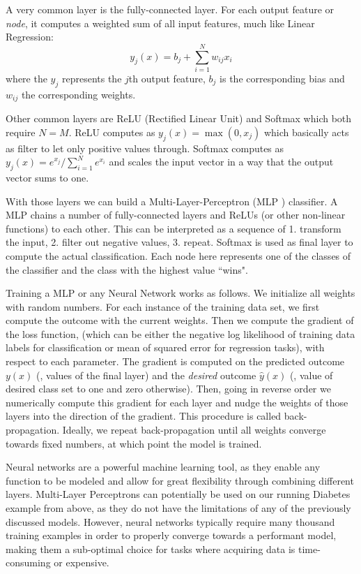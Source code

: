 A very common layer is the fully-connected layer.
For each output feature or \emph{node}, it computes a weighted sum of all input features, much like Linear Regression:
\[
y_j(x) = b_j + \sum^{N}_{i = 1} w_{ij} x_i
\]
where the $y_j$ represents the $j$th output feature, $b_j$ is the corresponding bias and $w_{ij}$ the corresponding weights.

Other common layers are ReLU (Rectified Linear Unit) and Softmax which both require $N = M$.
ReLU computes as $y_j(x) = \max{(0, x_j)}$ which basically acts as filter to let only positive values through.
Softmax computes as $y_j(x) = e^{x_j} / \sum^{N}_{i = 1} e^{x_i}$ and scales the input vector in a way that the output vector sums to one.

With those layers we can build a Multi-Layer-Perceptron (MLP \cite{mlp}) classifier.
A MLP chains a number of fully-connected layers and ReLUs (or other non-linear functions) to each other.
This can be interpreted as a sequence of 1. transform the input, 2. filter out negative values, 3. repeat.
Softmax is used as final layer to compute the actual classification.
Each node here represents one of the classes of the classifier and the class with the highest value ``wins".

Training a MLP or any Neural Network works as follows.
We initialize all weights with random numbers.
For each instance of the training data set, we first compute the outcome with the current weights.
Then we compute the gradient of the loss function, (which can be either the negative log likelihood of training data labels for classification or mean of squared error for regression tasks), with respect to each parameter.
The gradient is computed on the predicted outcome $y(x)$ (\ie, values of the final layer) and the \emph{desired} outcome $\hat{y}(x)$ (\ie, value of desired class set to one and zero otherwise).
Then, going in reverse order we numerically compute this gradient for each layer and nudge the weights of those layers into the direction of the gradient.
This procedure is called back-propagation.
Ideally, we repeat back-propagation until all weights converge towards fixed numbers, at which point the model is trained.

Neural networks are a powerful machine learning tool, as they enable any function to be modeled \cite{hornik1991251} and allow for great flexibility through combining different layers.
Multi-Layer Perceptrons can potentially be used on our running Diabetes example from above, as they do not have the limitations of any of the previously discussed models.
However, neural networks typically require many thousand training examples in order to properly converge towards a performant model, making them a sub-optimal choice for tasks where acquiring data is time-consuming or expensive.

